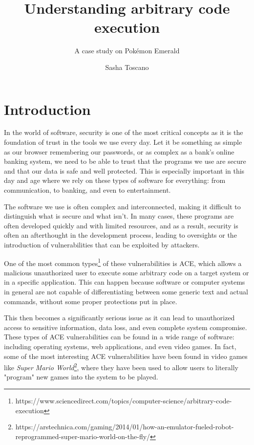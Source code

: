\documentclass[a4paper]{usiinfbachelorproject}
\author{Sasha Toscano}
\title{\textbf{Understanding arbitrary code
execution}}
\subtitle{A case study on Pokémon Emerald}
\begin{document}
\maketitle
\tableofcontents\newpage

\section{Introduction}
In the world of software, security is one of the most critical concepts as it is the foundation of trust in the tools we use every day. Let it be something as simple as our browser remembering our passwords, or as complex as a bank's online banking system, we need to be able to trust that the programs we use are secure and that our data is safe and well protected. This is especially important in this day and age where we rely on these types of software for everything: from communication, to banking, and even to entertainment.

The software we use is often complex and interconnected, making it difficult to distinguish what is secure and what isn't. In many cases, these programs are often developed quickly and with limited resources, and as a result, security is often an afterthought in the development process, leading to oversights or the introduction of vulnerabilities that can be exploited by attackers.

One of the most common types\footnote{https://www.sciencedirect.com/topics/computer-science/arbitrary-code-execution} of these vulnerabilities is ACE, which allows a malicious unauthorized user to execute some arbitrary code on a target system or in a specific application. This can happen because software or computer systems in general are not capable of differentiating between some generic text and actual commands, without some proper protections put in place.

This then becomes a significantly serious issue as it can lead to unauthorized access to sensitive information, data loss, and even complete system compromise. These types of ACE vulnerabilities can be found in a wide range of software: including operating systems, web applications, and even video games. In fact, some of the most interesting ACE vulnerabilities have been found in video games like \textit{Super Mario World}\footnote{https://arstechnica.com/gaming/2014/01/how-an-emulator-fueled-robot-reprogrammed-super-mario-world-on-the-fly/}, where they have been used to allow users to literally "program" new games into the system to be played.
\end{document}
